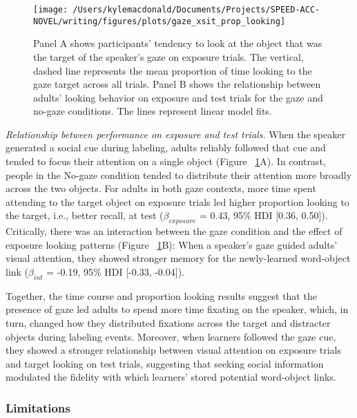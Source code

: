 \documentclass[man,floatsintext]{apa6}
\begin{document}
\begin{figure}[!t]

{\centering \texttt{[image: /Users/kylemacdonald/Documents/Projects/SPEED-ACC-NOVEL/writing/figures/plots/gaze\_xsit\_prop\_looking]} 

}

\caption{Panel A shows participants’ tendency to look at the object that was the target of the speaker’s gaze on exposure trials. The vertical, dashed line represents the mean proportion of time looking to the gaze target across all trials. Panel B shows the relationship between adults' looking behavior on exposure and test trials for the gaze and no-gaze conditions. The lines represent linear model fits.}\label{fig:gaze-xsit-prop-looking-plot}
\end{figure}

\emph{Relationship between performance on exposure and test trials.}
When the speaker generated a social cue during labeling, adults reliably
followed that cue and tended to focus their attention on a single object
(Figure ~\ref{fig:gaze-xsit-prop-looking-plot}A). In contrast, people in
the No-gaze condition tended to distribute their attention more broadly
across the two objects. For adults in both gaze contexts, more time
spent attending to the target object on exposure trials led higher
proportion looking to the target, i.e., better recall, at test
(\(\beta_{exposure}\) = 0.43, 95\% HDI {[}0.36, 0.50{]}). Critically,
there was an interaction between the gaze condition and the effect of
exposure looking patterns (Figure
~\ref{fig:gaze-xsit-prop-looking-plot}B): When a speaker's gaze guided
adults' visual attention, they showed stronger memory for the
newly-learned word-object link (\(\beta_{int}\) = -0.19, 95\% HDI
{[}-0.33, -0.04{]}).

Together, the time course and proportion looking results suggest that
the presence of gaze led adults to spend more time fixating on the
speaker, which, in turn, changed how they distributed fixations across
the target and distracter objects during labeling events. Moreover, when
learners followed the gaze cue, they showed a stronger relationship
between visual attention on exposure trials and target looking on test
trials, suggesting that seeking social information modulated the
fidelity with which learners' stored potential word-object links.

\subsubsection{Limitations}\label{limitations}
\end{document}

